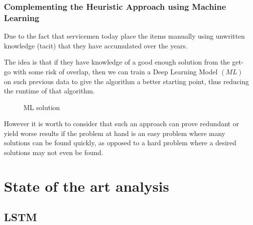 \documentclass[12pt,a4paper]{report}
\begin{document}
\subsection{Complementing the Heuristic Approach using Machine Learning}
Due to the fact that servicemen today place the items manually using unwritten knowledge (tacit) that they have accumulated over the years.

The idea is that if they have knowledge of a good enough solution from the get-go with some risk of overlap, then we can train a Deep Learning Model $(M\!L)$ on such previous data to give the algorithm a better starting point, thus reducing the runtime of that algorithm.

\begin{figure}[ht]
    \centering
    \caption{ML solution}
    \label{fig:ml_solution}
\end{figure}

However it is worth to consider that such an approach can prove redundant or yield worse results if the problem at hand is an easy problem where many solutions can be found quickly, as opposed to a hard problem where a desired solutions may not even be found. 

\chapter{State of the art analysis}
\section{LSTM}
\end{document}
